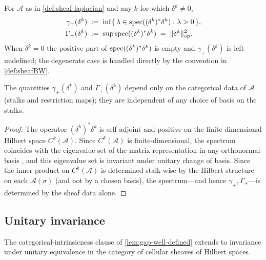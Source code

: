 \begin{definition}\label{def:spectral-gap}
For $\mathscr{A}$ as in \cref{def:sheaf-laplacian} and any $k$ for
which $\delta^k \ne 0$,
\begin{align*}
  \gamma_+(\delta^k) &\;:=\;
    \inf\{\, \lambda \in \operatorname{spec}((\delta^k)^* \delta^k) :
              \lambda > 0 \,\}, \\
  \Gamma_+(\delta^k) &\;:=\;
    \sup \operatorname{spec}((\delta^k)^* \delta^k)
    \;=\; \lVert \delta^k \rVert_{\mathrm{op}}^2.
\end{align*}
When $\delta^k = 0$ the positive part of
$\operatorname{spec}((\delta^k)^* \delta^k)$ is empty and $\gamma_+(\delta^k)$ is
left undefined; the degenerate case is handled directly by the
convention in \cref{def:sheafBW}.
\end{definition}

\begin{lemma}\label{lem:gap-well-defined}
The quantities $\gamma_+(\delta^k)$ and $\Gamma_+(\delta^k)$ depend
only on the categorical data of $\mathscr{A}$ (stalks and
restriction maps); they are independent of any choice of basis on
the stalks.
\end{lemma}

\begin{proof}
The operator $(\delta^k)^* \delta^k$ is self-adjoint and positive on
the finite-dimensional Hilbert space $C^k(\mathscr{A})$. Since
$C^k(\mathscr{A})$ is finite-dimensional, the spectrum coincides with
the eigenvalue set of the matrix representation in any orthonormal
basis \cite[\S VI.1, \S VII.1]{ReedSimonI}, and this eigenvalue set is
invariant under unitary change of basis. Since the inner product on
$C^k(\mathscr{A})$ is determined stalk-wise by the Hilbert structure
on each $\mathscr{A}(\sigma)$ (and not by a chosen basis), the
spectrum---and hence $\gamma_+, \Gamma_+$---is determined by the
sheaf data alone.
\end{proof}

\subsection{Unitary invariance}\label{subsec:sheafbw-unitary}

The categorical-intrinsicness clause of \cref{lem:gap-well-defined}
extends to invariance under unitary equivalence in the category of
cellular sheaves of Hilbert spaces.

